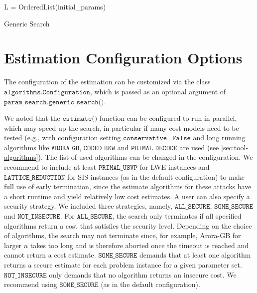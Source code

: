 \begin{algorithm2e} %

    L = OrderedList(initial\_params)\\
    \caption{Generic Search} \label{alg:generic-search}
\end{algorithm2e}


\section{Estimation Configuration Options}\label{sec:config-options}
The configuration of the estimation can be customized via the class $\texttt{algorithms.Configuration}$, which is passed as an optional argument of $\texttt{param\_search.generic\_search()}$.

We noted that the $\texttt{estimate()}$ function can be configured to run in parallel, which may speed up the search, in particular if many cost models need to be tested (e.g., with configuration setting $\texttt{conservative=False}$ and long running algorithms like $\texttt{ARORA\_GB}$, $\texttt{CODED\_BKW}$ and $\texttt{PRIMAL\_DECODE}$ are used (see \cref{sec:tool-algorithms}). The list of used algorithms can be changed in the configuration. We recommend to include at least $\texttt{PRIMAL\_USVP}$ for LWE instances and $\texttt{LATTICE\_REDUCTION}$ for SIS instances (as in the default configuration) to make full use of early termination, since the estimate algorithms for these attacks have a short runtime and yield relatively low cost estimates. A user can also specify a security strategy. We included three strategies, namely, $\texttt{ALL\_SECURE}$, $\texttt{SOME\_SECURE}$ and $\texttt{NOT\_INSECURE}$. For $\texttt{ALL\_SECURE}$, the search only terminates if all specified algorithms return a cost that satisfies the security level. Depending on the choice of algorithms, the search may not terminate since, for example, Arora-GB for larger $n$ takes too long and is therefore aborted once the timeout is reached and cannot return a cost estimate. $\texttt{SOME\_SECURE}$ demands that at least one algorithm returns a secure estimate for each problem instance for a given parameter set. $\texttt{NOT\_INSECURE}$ only demands that no algorithm returns an insecure cost. We recommend using $\texttt{SOME\_SECURE}$ (as in the default configuration).


